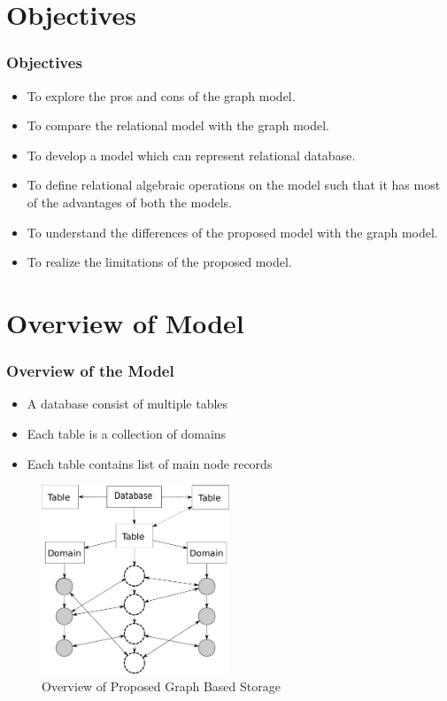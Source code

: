 \documentclass[14pt,xcolor=dvipsnames, aspectratio=169]{beamer}
\begin{document}
\section{Objectives}
\begin{frame}
 \frametitle{Objectives}
 \begin{itemize}
 \item<1-> To explore the pros and cons of the graph model.
 \item<2-> To compare the relational model with the graph model.
 \item<3-> To develop a model which can represent relational database.
 \item<4-> To define relational algebraic operations on the model such that it has most of the advantages of both the models.
 \item<5-> To understand the differences of the proposed model with the graph model.
 \item<6-> To realize the limitations of the proposed model.
 \end{itemize}
\end{frame}

\section{Overview of Model}
\begin{frame}
 \frametitle{Overview of the Model}
 \begin{itemize}
  \item<1-> A database consist of multiple tables
  \item<2-> Each table is a collection of domains
  \item<3-> Each table contains list of main node records
 \end{itemize}
\end{frame}

\begin{frame}
\begin{figure}[t]
 \centering
 \includegraphics[width=0.5\textwidth]{pics/model.pdf}
 \caption{Overview of Proposed Graph Based Storage}
 \label{fig:overview}
\end{figure}
\end{frame}
\end{document}
